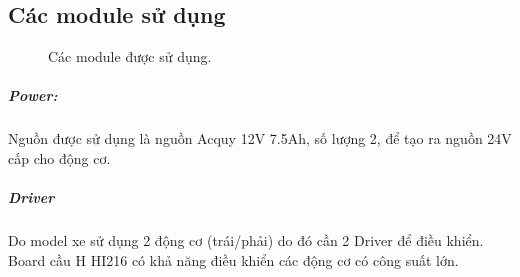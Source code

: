 \documentclass[a4paper, 12pt]{article}
\begin{document}
	\subsection{Các module sử dụng}
	\begin{figure}[h]%
		\centering
		\qquad
		\qquad
		\quad
		\quad
		\quad
		
		\caption{Các module được sử dụng.}
		\label{3figs}
	\end{figure}
	\subparagraph{Power:}
	Nguồn được sử dụng là nguồn Acquy 12V 7.5Ah, số lượng 2, để tạo ra nguồn 24V cấp cho động cơ.
	\subparagraph{Driver}
	Do model xe sử dụng 2 động cơ (trái/phải) do đó cần 2 Driver để điều khiển. Board cầu H HI216 có khả năng điều khiển các động cơ có công suất lớn.
	
\end{document}
